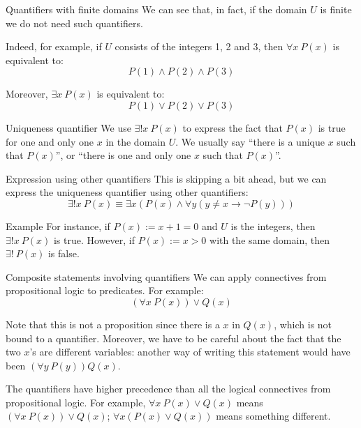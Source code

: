 \documentclass{article}
\begin{document}
\begin{parag}{Quantifiers with finite domains}
    We can see that, in fact, if the domain $U$ is finite we do not need such quantifiers.

    Indeed, for example, if $U$ consists of the integers 1, 2 and 3, then $\forall x\ P\left(x\right)$ is equivalent to: 
    \[P\left(1\right) \land P\left(2\right) \land P\left(3\right)\]
    
    Moreover, $\exists x\ P\left(x\right)$ is equivalent to: 
    \[P\left(1\right) \lor P\left(2\right) \lor P\left(3\right)\]
    
\end{parag}

\begin{parag}{Uniqueness quantifier}
    We use $\exists!x\ P\left(x\right)$ to express the fact that $P\left(x\right)$ is true for one and only one $x$ in the domain $U$. We usually say ``there is a unique $x$ such that $P(x)$'', or ``there is one and only one $x$ such that $P\left(x\right)$''.

    \begin{subparag}{Expression using other quantifiers}
        This is skipping a bit ahead, but we can express the uniqueness quantifier using other quantifiers:
        \[\exists!x\ P\left(x\right) \equiv \exists x \left(P\left(x\right) \land \forall y \left(y \neq x \to \lnot P\left(y\right)\right)\right) \]
    \end{subparag}
\end{parag}

\begin{parag}{Example}
    For instance, if $P\left(x\right) := x + 1 = 0$ and $U$ is the integers, then $\exists!x\ P\left(x\right)$ is true. However, if $P\left(x\right) := x > 0$ with the same domain, then $\exists!\ P\left(x\right)$ is false.
\end{parag}

\begin{parag}{Composite statements involving quantifiers}
    We can apply connectives from propositional logic to predicates. For example: 
    \[\left(\forall x\ P\left(x\right)\right) \lor Q\left(x\right)\]
    
    Note that this is not a proposition since there is a $x$ in $Q\left(x\right)$, which is not bound to a quantifier. Moreover, we have to be careful about the fact that the two $x$'s are different variables: another way of writing this statement would have been $\left(\forall y\ P\left(y\right)\right)Q\left(x\right)$. 

    The quantifiers have higher precedence than all the logical connectives from propositional logic. For example, $\forall x\ P\left(x\right) \lor Q\left(x\right)$ means $\left(\forall x\ P\left(x\right)\right) \lor Q\left(x\right)$; $\forall x\left(P\left(x\right) \lor Q\left(x\right)\right)$ means something different.
\end{parag}
\end{document}
